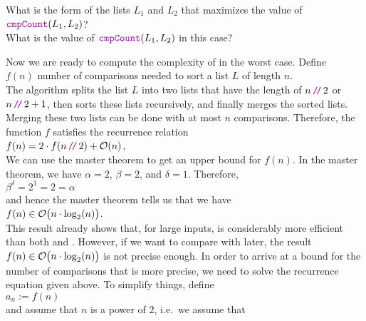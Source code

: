 \exercise
What is the form of the lists $L_1$ and $L_2$ that maximizes the value of 
\\[0.2cm]
\hspace*{1.3cm}
$\mytt{cmpCount}(L_1, L_2)$?
\\[0.2cm]
What is the value of $\mytt{cmpCount}(L_1, L_2)$ in this case? \eox
\vspace*{0.3cm}

\noindent
Now we are ready to compute the complexity of  in the worst case.  Define
\\[0.2cm]
\hspace*{1.3cm}
$f(n)$  \mytt{:=} number of comparisons needed to sort a list $L$ of length $n$.
\\[0.2cm]
The algorithm  
splits the list $L$ into two lists that have the length of $n\dv 2$ or $n\dv 2+1$, then sorts
these lists recursively, and finally merges the sorted lists.  Merging these two lists can be done with
at most $n$ comparisons.  Therefore, the function $f$ satisfies the recurrence relation
\\[0.2cm]
\hspace*{1.3cm}
$f(n) = 2 \cdot f(n \dv  2) + \Oh(n)$,
\\[0.2cm]
We can use the master theorem to get an upper bound for $f(n)$.  In the master theorem, we have
$\alpha = 2$, $\beta = 2$, and $\delta = 1$. Therefore,
\\[0.2cm]
\hspace*{1.3cm}
$\beta^\delta = 2^1 = 2 = \alpha$
\\[0.2cm]
and hence the master theorem tells us that we have
\\[0.2cm]
\hspace*{1.3cm}
$f(n) \in \mathcal{O}\bigl(n \cdot \log_2(n) \bigr)$.
\\[0.2cm]
This result already shows that, for large inputs,  is considerably more efficient
than both  and .  However, if we want to compare
 with  later, the result $f(n) \in \mathcal{O}\bigl(n \cdot \log_2(n) \bigr)$ is
not precise enough.  In order to arrive at a bound for the number of comparisons that is more precise,
we need to solve the recurrence equation given above.  To simplify things,  define
\\[0.2cm]
\hspace*{1.3cm}
$a_n := f(n)$ 
\\[0.2cm]
and assume that $n$ is a power of $2$, i.e.~we assume that
\\[0.2cm]
